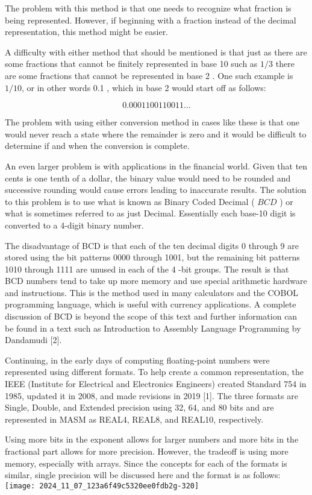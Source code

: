 \documentclass[10pt]{article}
\begin{document}
The problem with this method is that one needs to recognize what fraction is being represented. However, if beginning with a fraction instead of the decimal representation, this method might be easier.

A difficulty with either method that should be mentioned is that just as there are some fractions that cannot be finitely represented in base 10 such as $1 / 3$ there are some fractions that cannot be represented in base 2 . One such example is $1 / 10$, or in other words 0.1 , which in base 2 would start off as follows:

$$
0.0001100110011 \ldots
$$

The problem with using either conversion method in cases like these is that one would never reach a state where the remainder is zero and it would be difficult to determine if and when the conversion is complete.

An even larger problem is with applications in the financial world. Given that ten cents is one tenth of a dollar, the binary value would need to be rounded and successive rounding would cause errors leading to inaccurate results. The solution to this problem is to use what is known as Binary Coded Decimal ( $B C D$ ) or what is sometimes referred to as just Decimal. Essentially each base-10 digit is converted to a 4-digit binary number.

The disadvantage of BCD is that each of the ten decimal digits 0 through 9 are stored using the bit patterns 0000 through 1001, but the remaining bit patterns 1010 through 1111 are unused in each of the 4 -bit groups. The result is that BCD numbers tend to take up more memory and use special arithmetic hardware and instructions. This is the method used in many calculators and the COBOL programming language, which is useful with currency applications. A complete discussion of BCD is beyond the scope of this text and further information can be found in a text such as Introduction to Assembly Language Programming by Dandamudi [2].

Continuing, in the early days of computing floating-point numbers were represented using different formats. To help create a common representation, the IEEE (Institute for Electrical and Electronics Engineers) created Standard 754 in 1985, updated it in 2008, and made revisions in 2019 [1]. The three formats are Single, Double, and Extended precision using 32, 64, and 80 bits and are represented in MASM as REAL4, REAL8, and REAL10, respectively.

Using more bits in the exponent allows for larger numbers and more bits in the fractional part allows for more precision. However, the tradeoff is using more memory, especially with arrays. Since the concepts for each of the formats is similar, single precision will be discussed here and the format is as follows:\\
\texttt{[image: 2024\_11\_07\_123a6f49c5320ee0fdb2g-320]}
\end{document}
